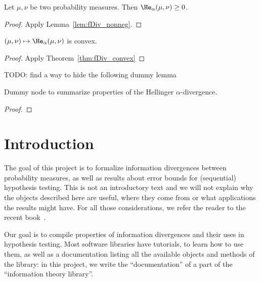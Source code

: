 \begin{lemma}
  \label{lem:hellingerAlpha_nonneg}
  \leanok
  Let $\mu, \nu$ be two probability measures. Then $\He_\alpha(\mu, \nu) \ge 0$.
\end{lemma}

\begin{proof} \leanok
{}
Apply Lemma~\ref{lem:fDiv_nonneg}.
\end{proof}


\begin{lemma}
  \label{lem:hellingerAlpha_convex}
  $(\mu, \nu) \mapsto \He_\alpha(\mu, \nu)$ is convex.
\end{lemma}

\begin{proof}
Apply Theorem~\ref{thm:fDiv_convex}
\end{proof}



TODO: find a way to hide the following dummy lemma
\begin{lemma}
  \label{lem:hellingerAlpha_properties}
  \leanok
  Dummy node to summarize properties of the Hellinger $\alpha$-divergence.
\end{lemma}

\begin{proof}\leanok
{}
\end{proof}

\chapter*{Introduction}

The goal of this project is to formalize information divergences between probability measures, as well as results about error bounds for (sequential) hypothesis testing.
This is not an introductory text and we will not explain why the objects described here are useful, where they come from or what applications the results might have. For all those considerations, we refer the reader to the recent book~\cite{polyanskiy2024information}.

Our goal is to compile properties of information divergences and their uses in hypothesis testing. Most software libraries have tutorials, to learn how to use them, as well as a documentation listing all the available objects and methods of the library: in this project, we write the ``documentation'' of a part of the ``information theory library''.




